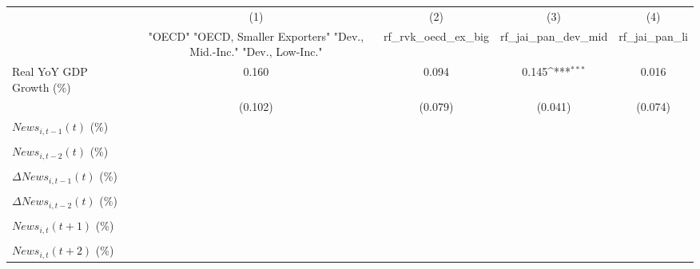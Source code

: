 {
\def\sym#1{\ifmmode^{#1}\else\(^{#1}\)\fi}
\begin{tabular}{l*{4}{c}}
\toprule
                    &\multicolumn{1}{c}{(1)}&\multicolumn{1}{c}{(2)}&\multicolumn{1}{c}{(3)}&\multicolumn{1}{c}{(4)}\\
                    &\multicolumn{1}{c}{ "OECD" "OECD, Smaller Exporters" "Dev., Mid.-Inc." "Dev., Low-Inc."}&\multicolumn{1}{c}{rf_rvk_oecd_ex_big}&\multicolumn{1}{c}{rf_jai_pan_dev_mid}&\multicolumn{1}{c}{rf_jai_pan_li}\\
\midrule
Real YoY GDP Growth (\%)&       0.160         &       0.094         &       0.145\sym{***}&       0.016         \\
                    &     (0.102)         &     (0.079)         &     (0.041)         &     (0.074)         \\
\addlinespace
$ News_{i,t-1}(t)$ (\%)&                     &                     &                     &                     \\
                    &                     &                     &                     &                     \\
\addlinespace
$ News_{i,t-2}(t)$ (\%)&                     &                     &                     &                     \\
                    &                     &                     &                     &                     \\
\addlinespace
$ \Delta News_{i,t-1}(t)$ (\%)&                     &                     &                     &                     \\
                    &                     &                     &                     &                     \\
\addlinespace
$ \Delta News_{i,t-2}(t)$ (\%)&                     &                     &                     &                     \\
                    &                     &                     &                     &                     \\
\addlinespace
$ News_{i,t}(t+1)$ (\%)&                     &                     &                     &                     \\
                    &                     &                     &                     &                     \\
\addlinespace
$ News_{i,t}(t+2)$ (\%)&                     &                     &                     &                     \\

\end{tabular}}
